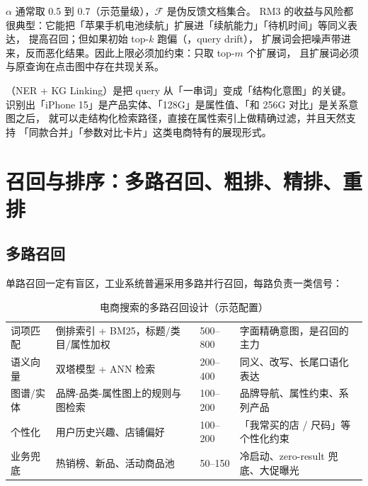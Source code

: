 $\alpha$ 通常取 0.5 到 0.7（示范量级），$\mathcal{F}$ 是伪反馈文档集合。
RM3 的收益与风险都很典型：它能把「苹果手机电池续航」扩展进「续航能力」「待机时间」等同义表达，
提高召回；但如果初始 top-$k$ 跑偏（，query drift），
扩展词会把噪声带进来，反而恶化结果。因此上限必须加约束：只取 top-$m$ 个扩展词，
且扩展词必须与原查询在点击图中存在共现关系。

（NER + KG Linking）是把 query 从「一串词」变成「结构化意图」的关键。
识别出「iPhone 15」是产品实体、「128G」是属性值、「和 256G 对比」是关系意图之后，
就可以走结构化检索路径，直接在属性索引上做精确过滤，并且天然支持
「同款合并」「参数对比卡片」这类电商特有的展现形式。

\section{召回与排序：多路召回、粗排、精排、重排}
\label{sec:search-cascade}

\subsection{多路召回}

单路召回一定有盲区，工业系统普遍采用多路并行召回，每路负责一类信号：

\begin{table}[htbp]
\centering
\caption{电商搜索的多路召回设计（示范配置）}
\label{tab:multirecall}
\small
\begin{tabularx}{\textwidth}{L{2.3cm} L{3.2cm} L{2.4cm} Y}
\toprule
{} &  &  &  \\
\midrule
词项匹配 & 倒排索引 + BM25，标题/类目/属性加权 & 500--800 & 字面精确意图，是召回的主力 \\
\addlinespace
语义向量 & 双塔模型 + ANN 检索\cite{karpukhin2020dpr,johnson2019faiss} & 200--400 & 同义、改写、长尾口语化表达 \\
\addlinespace
图谱/实体 & 品牌-品类-属性图上的规则与图检索 & 100--200 & 品牌导航、属性约束、系列产品 \\
\addlinespace
个性化 & 用户历史兴趣、店铺偏好 & 100--200 & 「我常买的店 / 尺码」等个性化约束 \\
\addlinespace
业务兜底 & 热销榜、新品、活动商品池 & 50--150 & 冷启动、zero-result 兜底、大促曝光 \\
\bottomrule
\end{tabularx}
\end{table}

